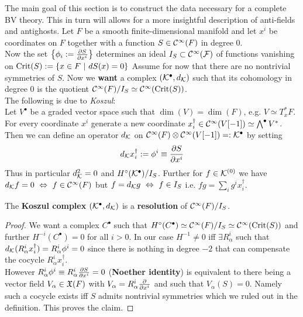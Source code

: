 The main goal of this section is to construct the data necessary for a complete BV theory. This in turn will allows for a more insightful description of anti-fields and antighosts. Let $F$ be a smooth finite-dimensional manifold and let ${x^i}$ be coordinates on $F$ together with a function $S \in \mathcal{C}^{\infty}(F)$ in degree $0$.\\

Now the set $\left\{\phi_i := \dell{S}{x^i}\right\}$ determines an ideal $I_S \subset \mathcal{C}^{\infty}({\mathcal{F}})$ of functions vanishing on $\operatorname{Crit}(S) := \{ x \in F \ | \ dS(x) = 0 \}$
Assume for now that there are no nontrivial symmetries of $S$. Now we \textbf{want} a complex $({\mathcal{K}}^\bullet, d_{{\mathcal{K}}})$ such that its cohomology in degree $0$ is the quotient $\mathcal{C}^{\infty}(F)/I_S \simeq \mathcal{C}^{\infty}(\operatorname{Crit}(S))$.\\

The following is due to \emph{Koszul}:\\
Let $V^\bullet$ be a graded vector space such that $\dim(V) = \dim(F)$, e.g. $V \simeq T^*_x F$. For every coordinate $x^i$ generate a new coordinate $x^\dagger_i \in \mathcal{C}^{\infty}(V[-1]) \simeq \bigwedge^\bullet V^*$. Then we can define an operator $d_{{\mathcal{K}}}$ on $\mathcal{C}^{\infty}(F) \otimes \mathcal{C}^{\infty}(V[-1]) =: {\mathcal{K}}^\bullet$ by setting
\begin{equation}
  d_\KK x^\dagger_i := \phi^i \equiv \dell{S}{x^i}
\end{equation}
Thus in particular $d_{{\mathcal{K}}}^2 = 0$ and $H^\circ({\mathcal{K}}^\bullet)/I_S$. Further for $f \in {\mathcal{K}}^{(0)}$ we have $d_{{\mathcal{K}}} f = 0 \ \Leftrightarrow \ f \in \mathcal{C}^{\infty}(F)$ but $f = d_\KK g \ \Leftrightarrow \ f \in I_S$ i.e. $fg = \sum_i g^i x^\dagger_i$.

\begin{prop}
  The \textbf{Koszul complex} $({\mathcal{K}}^\bullet, d_{{\mathcal{K}}})$ is a \textbf{resolution} of $\mathcal{C}^{\infty}(F)/I_S$.
\begin{proof}
  We want a complex $C^\bullet$ such that $H^\circ(C^\bullet) \simeq \mathcal{C}^{\infty}(F)/I_S \simeq \mathcal{C}^{\infty}(\operatorname{Crit}(S))$ and further $H^{-i} (C^\bullet) = 0$ for all $i > 0$. In our case $H^{-1} \neq 0$ iff $\exists R^i_\alpha$ such that $d_\KK (R^i_\alpha x^\dagger_i) = R^i_\alpha \phi^i = 0$ since there is nothing in degree $-2$ that can compensate the cocycle $R^i_\alpha x^\dagger_i$.\\

  However $R^i_\alpha \phi^i \equiv R^i_\alpha \dell{S}{x^i} = 0$ (\textbf{Noether identity}) is equivalent to there being a vector field $V_\alpha \in \mathfrak{X}(F)$ with $V_\alpha = R^i_\alpha \frac{\partial }{\partial x^i}$ and such that $V_\alpha(S) = 0$. Namely such a cocycle exists iff $S$ admits nontrivial symmetries which we ruled out in the definition. This proves the claim.
\end{proof}
\end{prop}

